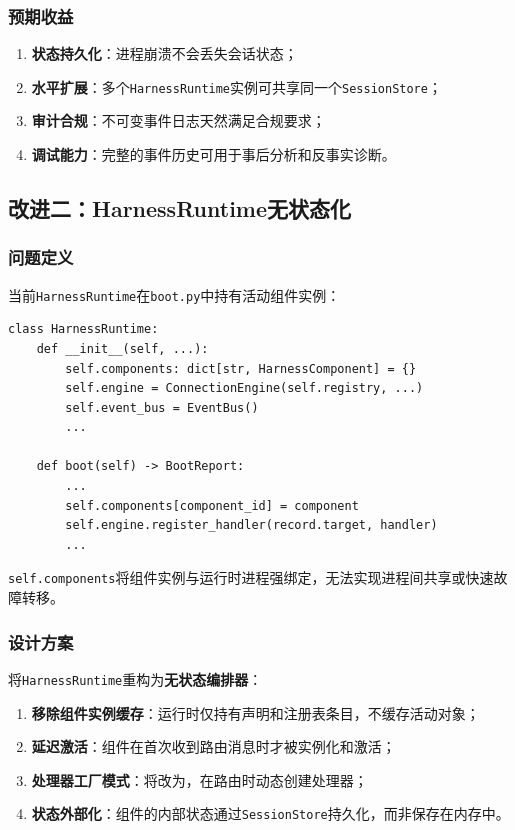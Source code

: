 \documentclass[12pt,a4paper]{ctexart}
\begin{document}
\subsubsection{预期收益}

\begin{enumerate}
    \item \textbf{状态持久化}：进程崩溃不会丢失会话状态；
    \item \textbf{水平扩展}：多个\texttt{HarnessRuntime}实例可共享同一个\texttt{SessionStore}；
    \item \textbf{审计合规}：不可变事件日志天然满足合规要求；
    \item \textbf{调试能力}：完整的事件历史可用于事后分析和反事实诊断。
\end{enumerate}

\subsection{改进二：HarnessRuntime无状态化}

\subsubsection{问题定义}

当前\texttt{HarnessRuntime}在\texttt{boot.py}中持有活动组件实例：

\begin{lstlisting}[caption={当前有状态的HarnessRuntime}]
class HarnessRuntime:
    def __init__(self, ...):
        self.components: dict[str, HarnessComponent] = {}
        self.engine = ConnectionEngine(self.registry, ...)
        self.event_bus = EventBus()
        ...

    def boot(self) -> BootReport:
        ...
        self.components[component_id] = component
        self.engine.register_handler(record.target, handler)
        ...
\end{lstlisting}

\texttt{self.components}将组件实例与运行时进程强绑定，无法实现进程间共享或快速故障转移。

\subsubsection{设计方案}

将\texttt{HarnessRuntime}重构为\textbf{无状态编排器}：

\begin{enumerate}
    \item \textbf{移除组件实例缓存}：运行时仅持有声明和注册表条目，不缓存活动对象；
    \item \textbf{延迟激活}：组件在首次收到路由消息时才被实例化和激活；
    \item \textbf{处理器工厂模式}：将改为，在路由时动态创建处理器；
    \item \textbf{状态外部化}：组件的内部状态通过\texttt{SessionStore}持久化，而非保存在内存中。
\end{enumerate}
\end{document}
